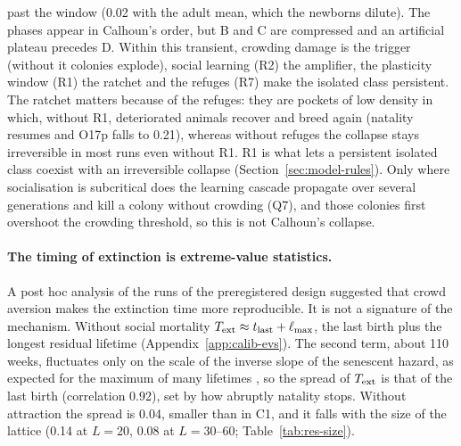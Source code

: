 past the window (0.02 with the adult mean, which the newborns dilute). The phases appear in Calhoun's order, but B
and C are compressed and an artificial plateau precedes D.
Within this transient, crowding damage is the trigger (without it colonies explode), social learning (R2) the
amplifier, the plasticity window (R1) the ratchet and the refuges (R7) make the isolated class persistent. The
ratchet matters because of the refuges: they are pockets of low density in which, without R1, deteriorated animals
recover and breed again (natality resumes and O17p falls to 0.21), whereas without refuges the collapse stays
irreversible in most runs even without R1. R1 is what lets a persistent isolated class coexist with an irreversible
collapse (Section~\ref{sec:model-rules}). Only where
socialisation is subcritical does the learning cascade propagate over several generations and kill a colony without
crowding (Q7), and those colonies first overshoot the crowding threshold, so this is not Calhoun's collapse.

\paragraph{The timing of extinction is extreme-value statistics.}
A post hoc analysis of the runs of the preregistered design suggested that crowd aversion makes the extinction time
more reproducible. It is not a
signature of the mechanism. Without social mortality $T_{\rm ext}\approx t_{\rm last}+\ell_{\max}$, the last birth
plus the longest residual lifetime (Appendix~\ref{app:calib-evs}). The second term, about 110 weeks, fluctuates only
on the scale of the inverse slope of the senescent hazard, as expected for the maximum of many lifetimes
\cite{Gumbel1958,Coles2001}, so the spread of $T_{\rm ext}$ is that of the last birth (correlation 0.92), set by how
abruptly natality stops. Without attraction the spread is 0.04, smaller than in \textsf{C1}, and it falls with the
size of the lattice (0.14 at $L=20$, 0.08 at $L=30$--60; Table~\ref{tab:res-size}).

